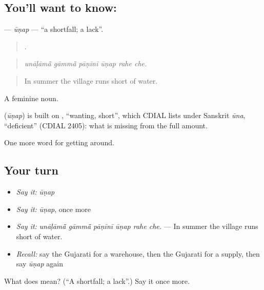 \subsection*{You'll want to know: }
\textbf{} — \emph{ūṇap} — \textquotedblleft{}a shortfall; a lack\textquotedblright{}.

\begin{quote}
     .
\end{quote}

\begin{quote}
\emph{unāḷāmā̃ gāmmā̃ pāṇīnī ūṇap rahe che.}
\end{quote}

\begin{quote}
In summer the village runs short of water.
\end{quote}

A feminine noun.

\begin{cousinweb}
\textbf{} (\emph{ūṇap}) is built on , \textquotedblleft{}wanting, short\textquotedblright{}, which CDIAL lists under Sanskrit \emph{ūna}, \textquotedblleft{}deficient\textquotedblright{} (CDIAL 2405): what is missing from the full amount.
\end{cousinweb}

\begin{grammarlens}[title={What you've built}]
One more word for getting around.
\end{grammarlens}

\subsection*{Your turn}
\begin{itemize}
\raggedright
  \item \emph{Say it:} \emph{ūṇap}
  \item \emph{Say it:} \emph{ūṇap}, once more
  \item \emph{Say it:} \emph{unāḷāmā̃ gāmmā̃ pāṇīnī ūṇap rahe che.} — In summer the village runs short of water.
  \item \emph{Recall:} say the Gujarati for a warehouse, then the Gujarati for a supply, then say \emph{ūṇap} again
\end{itemize}

\begin{tcolorbox}[breakable,colback=teal!4,colframe=teal!35!black,title={Before you move on}]
What does  mean? (\textquotedblleft{}A shortfall; a lack\textquotedblright{}.) Say it once more.
\end{tcolorbox}
